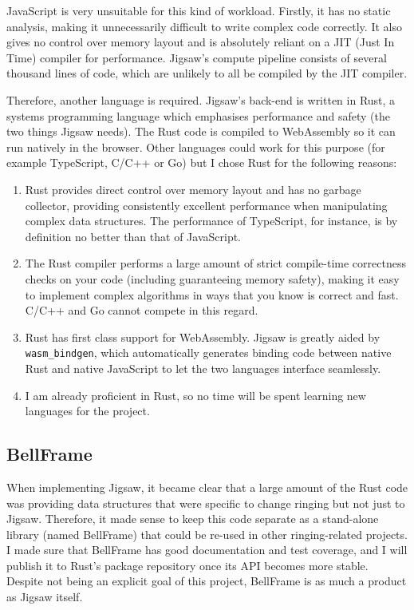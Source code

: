 \documentclass[12pt]{article}
\begin{document}
JavaScript is very unsuitable for this kind of workload.  Firstly, it has no static analysis, making
it unnecessarily difficult to write complex code correctly.  It also gives no control over memory
layout and is absolutely reliant on a JIT (Just In Time) compiler for performance.  Jigsaw's compute
pipeline consists of several thousand lines of code, which are unlikely to all be compiled by the JIT
compiler.


Therefore, another language is required.  Jigsaw's back-end is written in Rust, a systems
programming language which emphasises performance and safety (the two things Jigsaw needs).  The
Rust code is compiled to WebAssembly so it can run natively in the browser.  Other languages could
work for this purpose (for example TypeScript, C/C++ or Go) but I chose Rust for the following
reasons:

\begin{enumerate}
    \item Rust provides direct control over memory layout and has no garbage collector, providing
        consistently excellent performance when manipulating complex data structures.  The
        performance of TypeScript, for instance, is by definition no better than that of JavaScript.
    \item The Rust compiler performs a large amount of strict compile-time correctness checks on
        your code (including guaranteeing memory safety), making it easy to implement complex
        algorithms in ways that you know is correct and fast.  C/C++ and Go cannot compete in this
        regard.
    \item Rust has first class support for WebAssembly.  Jigsaw is greatly aided by
        \verb|wasm_bindgen|, which automatically generates binding code between native Rust and
        native JavaScript to let the two languages interface seamlessly.
    \item I am already proficient in Rust, so no time will be spent learning new languages for the
        project.
\end{enumerate}

\subsection{BellFrame}

When implementing Jigsaw, it became clear that a large amount of the Rust code was providing data
structures that were specific to change ringing but not just to Jigsaw.  Therefore, it made sense to
keep this code separate as a stand-alone library (named BellFrame) that could be re-used in other
ringing-related projects.  I made sure that BellFrame has good documentation and test coverage, and
I will publish it to Rust's package repository once its API becomes more stable.  Despite not being
an explicit goal of this project, BellFrame is as much a product as Jigsaw itself.
\end{document}
